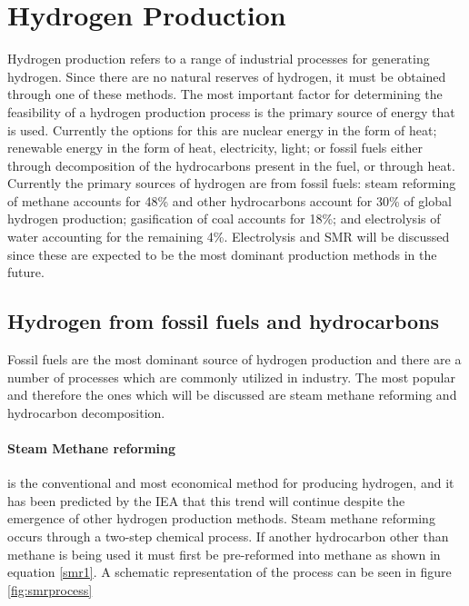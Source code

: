 \section{Hydrogen Production}
Hydrogen production refers to a range of industrial processes for generating hydrogen. 
Since there are no natural reserves of hydrogen, it must be obtained through one of these methods. The most important factor for determining the feasibility of a hydrogen production process is the primary source of energy that is used. Currently the options for this are nuclear energy in the form of heat; renewable energy in the form of heat, electricity, light; or fossil fuels either through decomposition of the hydrocarbons present in the fuel, or through heat. 
Currently the primary sources of hydrogen are from fossil fuels: steam reforming of methane accounts for 48\% and other hydrocarbons account for 30\% of global hydrogen production; gasification of coal accounts for 18\%; and electrolysis of water accounting for the remaining 4\%. \cite{Mangold2009} Electrolysis and SMR will be discussed since these are expected to be the most dominant production methods in the future. \cite{Holladay2009}

\subsection{Hydrogen from fossil fuels and hydrocarbons}
Fossil fuels are the most dominant source of hydrogen production \cite{Mangold2009} and there are a number of processes which are commonly utilized in industry. The most popular and therefore the ones which will be discussed are steam methane reforming and hydrocarbon decomposition.

\paragraph{Steam Methane reforming} is the conventional and most economical method for producing hydrogen, and it has been predicted by the 
IEA that this trend will continue despite the emergence of other hydrogen production methods. \cite{InternationalEnergyAgencyIEA2015}
Steam methane reforming occurs through a two-step chemical process. If another hydrocarbon other than methane is being used it must first be pre-reformed into methane as shown in equation \ref{smr1}. A schematic representation of the process can be seen in figure \ref{fig:smrprocess}

